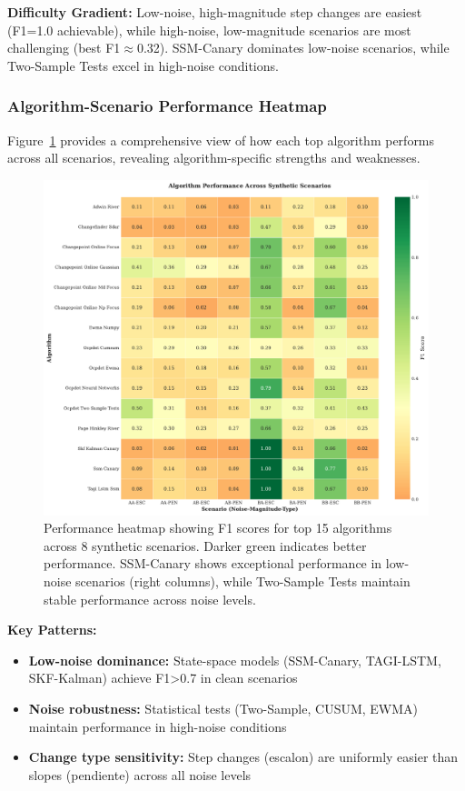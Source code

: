 \textbf{Difficulty Gradient:} Low-noise, high-magnitude step changes are easiest (F1=1.0 achievable), while high-noise, low-magnitude scenarios are most challenging (best F1$\approx$0.32). SSM-Canary dominates low-noise scenarios, while Two-Sample Tests excel in high-noise conditions.


\subsubsection{Algorithm-Scenario Performance Heatmap}

Figure~\ref{fig:scenario_heatmap} provides a comprehensive view of how each top algorithm performs across all scenarios, revealing algorithm-specific strengths and weaknesses.

\begin{figure}[H]
\centering
\includegraphics[width=\textwidth]{figures/fig_scenario_heatmap.pdf}
\caption{Performance heatmap showing F1 scores for top 15 algorithms across 8 synthetic scenarios. Darker green indicates better performance. SSM-Canary shows exceptional performance in low-noise scenarios (right columns), while Two-Sample Tests maintain stable performance across noise levels.}
\label{fig:scenario_heatmap}
\end{figure}

\textbf{Key Patterns:} 
\begin{itemize}
\item \textbf{Low-noise dominance:} State-space models (SSM-Canary, TAGI-LSTM, SKF-Kalman) achieve F1>0.7 in clean scenarios
\item \textbf{Noise robustness:} Statistical tests (Two-Sample, CUSUM, EWMA) maintain performance in high-noise conditions
\item \textbf{Change type sensitivity:} Step changes (escalon) are uniformly easier than slopes (pendiente) across all noise levels
\end{itemize}


